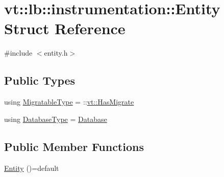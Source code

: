 \hypertarget{structvt_1_1lb_1_1instrumentation_1_1_entity}{}\section{vt\+:\+:lb\+:\+:instrumentation\+:\+:Entity Struct Reference}
\label{structvt_1_1lb_1_1instrumentation_1_1_entity}


{\ttfamily \#include $<$entity.\+h$>$}

\subsection*{Public Types}
\begin{DoxyCompactItemize}
\item 
using \hyperlink{structvt_1_1lb_1_1instrumentation_1_1_entity_a40dd6e30c20027d66b9193323d9e0cb0}{Migratable\+Type} = \+::\hyperlink{structvt_1_1_has_migrate}{vt\+::\+Has\+Migrate}
\item 
using \hyperlink{structvt_1_1lb_1_1instrumentation_1_1_entity_a2c8b6bfe6f30a4407a996aaae856b052}{Database\+Type} = \hyperlink{structvt_1_1lb_1_1instrumentation_1_1_database}{Database}
\end{DoxyCompactItemize}
\subsection*{Public Member Functions}
\begin{DoxyCompactItemize}
\item 
\hyperlink{structvt_1_1lb_1_1instrumentation_1_1_entity_a08e4ad21f5d3e02d468955a3f0b9f578}{Entity} ()=default
\end{DoxyCompactItemize}
